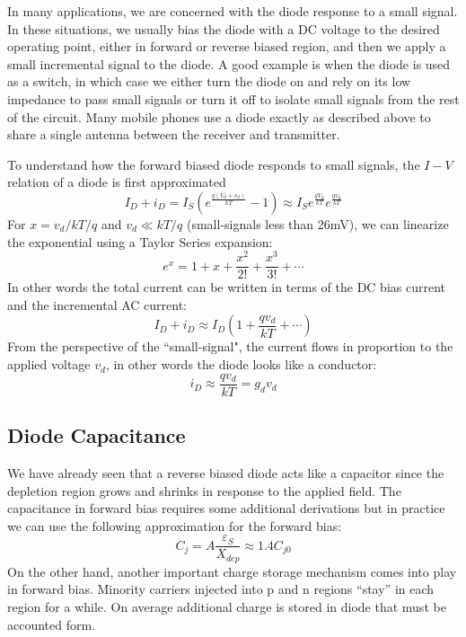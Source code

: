 In many applications, we are concerned with the diode response to a small signal.  In these situations, we usually bias the diode with a DC voltage to the desired operating point, either in forward or reverse biased region, and then we apply a small incremental signal to the diode.  A good example is when the diode is used as a switch, in which case we either turn the diode on and rely on its low impedance to pass small signals or turn it off to isolate small signals from the rest of the circuit. Many mobile phones use a diode exactly as described above to share a single antenna between the receiver and transmitter.  

To understand how the forward biased diode responds to small signals, the $I-V$ relation of a diode is first approximated
%
\begin{equation}
	{I_D} + {i_D} = {I_S}\left( {{e^{\frac{{q({V_d} + {v_d})}}{{kT}}}} - 1} \right) \approx 
{I_S}{e^{\frac{{q{V_d}}}{{kT}}}}{e^{\frac{{q{v_d}}}{{kT}}}}
\end{equation}
For $x = v_d/kT/q$ and $v_d \ll kT/q$ (small-signals less than 26mV),  we can linearize the exponential using a Taylor Series expansion:
\begin{equation}
	{e^x} = 1 + x + \frac{{{x^2}}}{{2!}} + \frac{{{x^3}}}{{3!}} +  \cdots 
\end{equation}
%
In other words the total current can be written in terms of the DC bias current and the incremental AC current:
\begin{equation}
	{I_D} + {i_D} \approx {I_D}\left( {1 + \frac{{q{v_d}}}{{kT}} +  \cdots } \right)
\end{equation}
From the perspective of the ``small-signal", the current flows in proportion to the applied voltage $v_d$, in other words the diode looks like a conductor:
\begin{equation}
	{i_D} \approx \frac{{q{v_d}}}{{kT}} = {g_d}{v_d}
\end{equation}

 
\subsection{Diode Capacitance}

We have already seen that a reverse biased diode acts like a capacitor since the depletion region grows and shrinks in response to the applied field.  The capacitance in forward bias requires some additional derivations but in practice we can use the following approximation for the forward bias:
\begin{equation}
	{C_j} = A\frac{{{\varepsilon _S}}}{{{X_{dep}}}} \approx 1.4C_{j0}
\end{equation}
%
On the other hand, another important charge storage mechanism comes into play in forward bias.   Minority carriers injected into p and n regions “stay” in each region for a while.   On average additional charge is stored in diode that must be accounted form.
 

